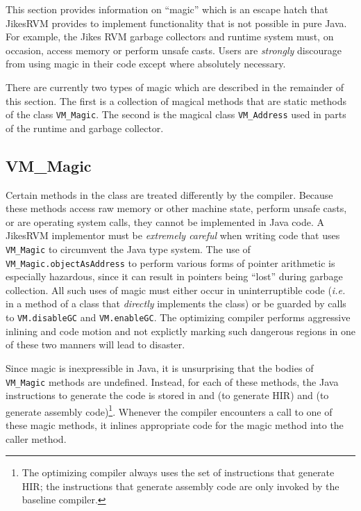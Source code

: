 This section provides information on ``magic'' which is an escape
hatch that Jikes\trademark RVM provides to implement
functionality that is not 
possible in pure Java\trademark.  For example, the Jikes RVM garbage
collectors and 
runtime system must, on occasion, access memory or perform unsafe
casts.  Users are {\it strongly} discourage from using magic in their code
except where absolutely necessary.  

There are currently two types of magic which are described in the remainder of this
section.  The first is a collection of magical methods
that are static methods of the class {\tt VM\_Magic}.  The second is the magical class
{\tt VM\_Address} used in parts of the runtime and garbage collector.

\subsection{VM\_Magic}
Certain methods in the class 
are treated differently by the compiler. Because these methods access
raw memory or other machine state, perform unsafe casts, 
or are operating system calls, they cannot be implemented in Java
code.  A Jikes\trademark RVM implementor must be {\em extremely
careful} when writing 
code that uses {\tt VM\_Magic} to circumvent the Java type
system.  The use of {\tt VM\_Magic.objectAsAddress} to perform various
forms of pointer arithmetic is especially hazardous, since it can
result in pointers being ``lost'' during garbage collection. 
All such uses of magic must either occur in uninterruptible
code ({\it i.e.} in a method of a class that {\em directly} implements 
the  class) 
or be guarded by calls to {\tt VM.disableGC} and {\tt VM.enableGC}.  
The optimizing compiler performs aggressive inlining and code motion 
and not explictly marking such dangerous regions in one of these two manners 
will lead to disaster.

Since magic is inexpressible in Java, it is unsurprising that the bodies 
of {\tt VM\_Magic} methods are undefined.  Instead, for each of these methods, 
the Java instructions to generate the code is stored in 
 and 
 (to generate HIR) and 
 (to generate assembly code)\footnote{The optimizing
compiler always uses the set of instructions that generate HIR; the
instructions that generate assembly code are only invoked by the
baseline compiler.}.  Whenever the compiler encounters a call to one of these
magic methods, it inlines appropriate code for the magic method into the caller method.

